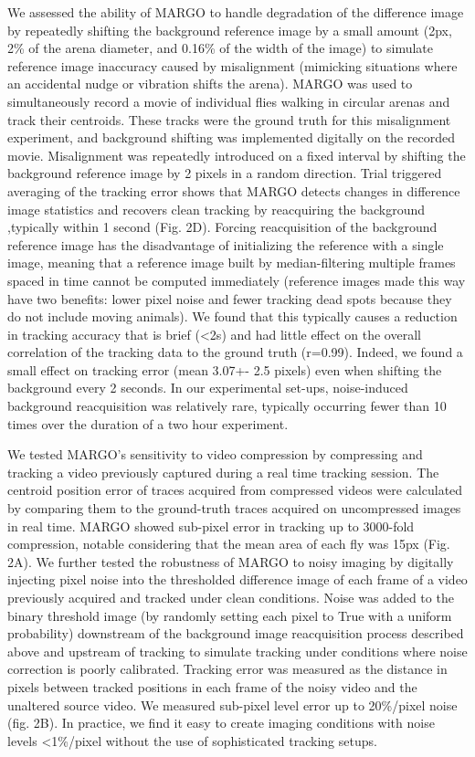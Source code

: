 \documentclass[10pt]{article}
\begin{document}
\begin{multicols}{2}
We assessed the ability of MARGO to handle degradation of the difference image by repeatedly shifting the background reference image by a small amount (2px, 2\% of the arena diameter, and 0.16\% of the width of the image) to simulate reference image inaccuracy caused by misalignment (mimicking situations where an accidental nudge or vibration shifts the arena). MARGO was used to simultaneously record a movie of individual flies walking in circular arenas and track their centroids. These tracks were the ground truth for this misalignment experiment, and background shifting was implemented digitally on the recorded movie. Misalignment was repeatedly introduced on a fixed interval by shifting the background reference image by 2 pixels in a random direction. Trial triggered averaging of the tracking error shows that MARGO detects changes in difference image statistics and recovers clean tracking by reacquiring the background ,typically within 1 second (Fig. 2D). Forcing reacquisition of the background reference image has the disadvantage of initializing the reference with a single image, meaning that a reference image built by median-filtering multiple frames spaced in time cannot be computed immediately (reference images made this way have two benefits: lower pixel noise and fewer tracking dead spots because they do not include moving animals). We found that this typically causes a reduction in tracking accuracy that is brief (<2s) and had little effect on the overall correlation of the tracking data to the ground truth (r=0.99). Indeed, we found a small effect on tracking error (mean 3.07+- 2.5 pixels) even when shifting the background every 2 seconds. In our experimental set-ups, noise-induced background reacquisition was relatively rare, typically occurring fewer than 10 times over the duration of a two hour experiment.

We tested MARGO's sensitivity to video compression by compressing and tracking a video previously captured during a real time tracking session. The centroid position error of traces acquired from compressed videos were calculated by comparing them to the ground-truth traces acquired on uncompressed images in real time. MARGO showed sub-pixel error in tracking up to 3000-fold compression, notable considering that the mean area of each fly was 15px (Fig. 2A). We further tested the robustness of MARGO to noisy imaging by digitally injecting pixel noise into the thresholded difference image of each frame of a video previously acquired and tracked under clean conditions. Noise was added to the binary threshold image (by randomly setting each pixel to True with a uniform probability) downstream of the background image reacquisition process described above and upstream of tracking to simulate tracking under conditions where noise correction is poorly calibrated. Tracking error was measured as the distance in pixels between tracked positions in each frame of the noisy video and the unaltered source video.  We measured sub-pixel level error up to 20\%/pixel noise (fig. 2B). In practice, we find it easy to create imaging conditions with noise levels <1\%/pixel without the use of sophisticated tracking setups.


\end{multicols}
\end{document}

